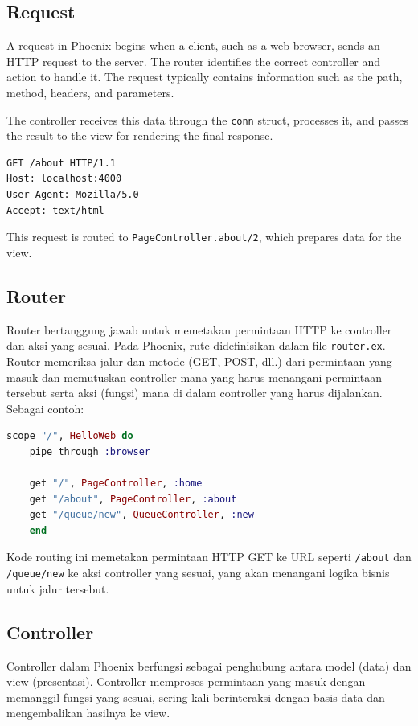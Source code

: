 \subsection{Request}

A request in Phoenix begins when a client, such as a web browser,  
sends an HTTP request to the server. The router identifies the correct  
controller and action to handle it. The request typically contains  
information such as the path, method, headers, and parameters.  

The controller receives this data through the \texttt{conn} struct,  
processes it, and passes the result to the view for rendering the  
final response.

\begin{lstlisting}[language=bash]
GET /about HTTP/1.1
Host: localhost:4000
User-Agent: Mozilla/5.0
Accept: text/html
\end{lstlisting}

This request is routed to \texttt{PageController.about/2},  
which prepares data for the view.


\subsection{Router}
Router bertanggung jawab untuk memetakan permintaan HTTP ke controller dan aksi yang sesuai. Pada Phoenix, rute didefinisikan dalam file \texttt{router.ex}. Router memeriksa jalur dan metode (GET, POST, dll.) dari permintaan yang masuk dan memutuskan controller mana yang harus menangani permintaan tersebut serta aksi (fungsi) mana di dalam controller yang harus dijalankan. Sebagai contoh:

\begin{lstlisting}[language=Elixir]
	scope "/", HelloWeb do
	pipe_through :browser
	
	get "/", PageController, :home
	get "/about", PageController, :about
	get "/queue/new", QueueController, :new
	end
\end{lstlisting}

Kode routing ini memetakan permintaan HTTP GET ke URL seperti \texttt{/about} dan \texttt{/queue/new} ke aksi controller yang sesuai, yang akan menangani logika bisnis untuk jalur tersebut.

\subsection{Controller}
Controller dalam Phoenix berfungsi sebagai penghubung antara model (data) dan view (presentasi). Controller memproses permintaan yang masuk dengan memanggil fungsi yang sesuai, sering kali berinteraksi dengan basis data dan mengembalikan hasilnya ke view.

